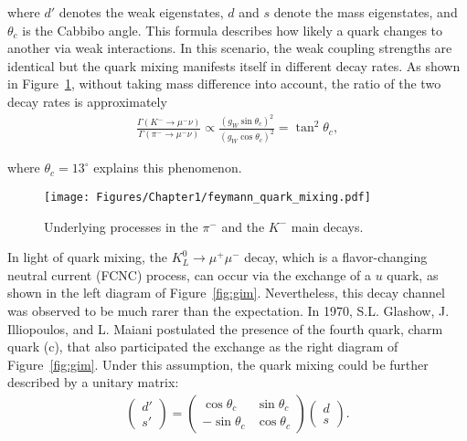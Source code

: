 \noindent
where $d'$ denotes the weak eigenstates, $d$ and $s$ denote the mass eigenstates, and $\theta_c$ is the Cabbibo angle. This formula describes how likely a quark changes to another via weak interactions. In this scenario, the weak coupling strengths are identical but the quark mixing manifests itself in different decay rates. As shown in Figure~\ref{fig:quark_mixing}, without taking mass difference into account, the ratio of the two decay rates is approximately
\vspace{1em}
\begin{align*}
\frac{\Gamma(K^-\to\mu^-\nu)}{\Gamma(\pi^-\to\mu^-\nu)} \propto \frac{(g_W \sin{\theta_c})^2}{(g_W \cos{\theta_c})^2} = \tan^2{\theta_c} ,
\end{align*}

\noindent
where $\theta_c = 13^{\circ}$ explains this phenomenon.

\begin{figure}[h]
\begin{center}
\captionsetup{width=.9\linewidth}
\texttt{[image: Figures/Chapter1/feymann\_quark\_mixing.pdf]}
\end{center}
\caption{Underlying processes in the $\pi^-$ and the $K^-$ main decays.}
\label{fig:quark_mixing}
\end{figure}

%
%


In light of quark mixing, the ${K_L^0 \to \mu^+ \mu^-}$ decay, which is a flavor-changing neutral current (FCNC) process, can occur via the exchange of a $u$ quark, as shown in the left diagram of Figure~\ref{fig:gim}. Nevertheless, this decay channel was observed to be much rarer than the expectation. In 1970, S.L. Glashow, J. Illiopoulos, and L. Maiani postulated the presence of the fourth quark, charm quark (c), that also participated the exchange as the right diagram of Figure~\ref{fig:gim}. Under this assumption, the quark mixing could be further described by a unitary matrix:
\vspace{1em}
\begin{align}
\begin{pmatrix}
d' \\
s'
\end{pmatrix}
=
\begin{pmatrix}
\cos{\theta_c} & \sin{\theta_c} \\
-\sin{\theta_c} & \cos{\theta_c}
\end{pmatrix}
\begin{pmatrix}
d \\
s
\end{pmatrix}. \label{formula::Cabibbo_matrix}
\end{align} 

